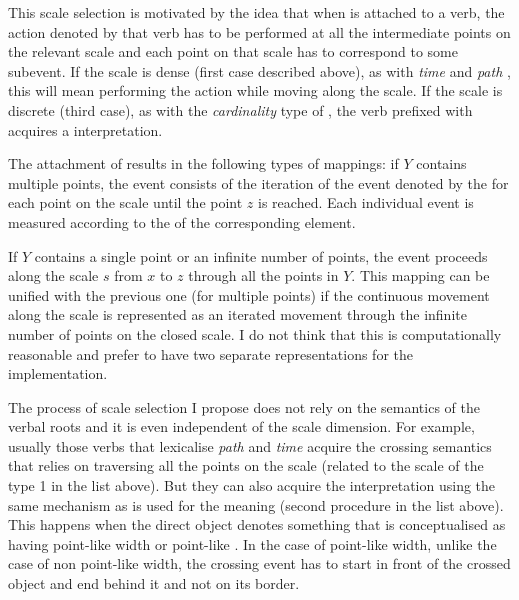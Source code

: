 This scale selection is motivated by the idea that when  is attached to a verb, the action denoted by that verb has to be performed at all the intermediate points on the relevant scale and each point on that scale has to correspond to some subevent. If the scale is dense (first case described above), as with \textit{time} and \textit{path} , this will mean performing the action while moving along the scale. If the scale is discrete (third case), as with the \textit{cardinality} type of , the verb prefixed with  acquires a  interpretation. 

The attachment of  results in the following types of mappings: %
if $Y$ contains multiple points, the event consists of the iteration of the event denoted by the  for each point on the scale until the point $z$ is reached. Each individual event is measured according to the  of the corresponding element.\largerpage

If $Y$ contains a single point or an infinite number of points, the event proceeds along the scale $s$ from $x$ to $z$ through all the points in $Y$. This mapping can be unified with the previous one (for multiple points) if the continuous movement along the scale is represented as an iterated movement through the infinite number of points on the closed scale. I do not think that this is computationally reasonable and prefer to have two separate representations for the implementation.

The process of scale selection I propose does not rely on the semantics of the verbal roots and it is even independent of the scale dimension. For example, usually those verbs that lexicalise \textit{path} and \textit{time}  acquire the crossing semantics that relies on traversing all the points on the scale (related to the scale of the type 1 in the list above). But they can also acquire the interpretation using the same mechanism as is used for the  meaning (second procedure in the list above). This happens when the direct object denotes something that is conceptualised as having point-like width or point-like . In the case of point-like width, unlike the case of non point-like width, the crossing event has to start in front of the crossed object and end behind it and not on its border.

